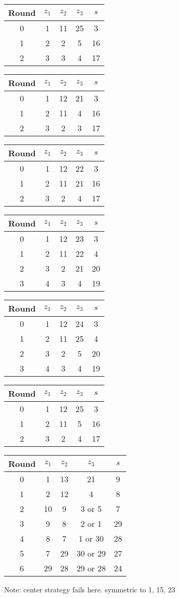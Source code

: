 \begin{tabular}{c | c | c | c | c }
Round & $z_1$ & $z_2$ & $z_3$ & $s$ \\
\hline
0 & 1 & 11 & 25 & 3 \\
1 & 2 & 2 & 5 & 16 \\
2 & 3 & 3 & 4 & 17
\end{tabular}

\begin{tabular}{c | c | c | c | c }
Round & $z_1$ & $z_2$ & $z_3$ & $s$ \\
\hline
0 & 1 & 12 & 21 & 3 \\
1 & 2 & 11 & 4 & 16 \\
2 & 3 & 2 & 3 & 17
\end{tabular}

\begin{tabular}{c | c | c | c | c }
Round & $z_1$ & $z_2$ & $z_3$ & $s$ \\
\hline
0 & 1 & 12 & 22 & 3 \\
1 & 2 & 11 & 21 & 16 \\
2 & 3 & 2 & 4 & 17
\end{tabular}

\begin{tabular}{c | c | c | c | c }
Round & $z_1$ & $z_2$ & $z_3$ & $s$ \\
\hline
0 & 1 & 12 & 23 & 3 \\
1 & 2 & 11 & 22 & 4 \\
2 & 3 & 2 & 21 & 20 \\
3 & 4 & 3 & 4 & 19
\end{tabular}

\begin{tabular}{c | c | c | c | c }
Round & $z_1$ & $z_2$ & $z_3$ & $s$ \\
\hline
0 & 1 & 12 & 24 & 3 \\
1 & 2 & 11 & 25 & 4 \\
2 & 3 & 2 & 5 & 20 \\
3 & 4 & 3 & 4 & 19
\end{tabular}

\begin{tabular}{c | c | c | c | c }
Round & $z_1$ & $z_2$ & $z_3$ & $s$ \\
\hline
0 & 1 & 12 & 25 & 3 \\
1 & 2 & 11 & 5 & 16 \\
2 & 3 & 2 & 4 & 17
\end{tabular}

\begin{tabular}{c | c | c | c | c }
Round & $z_1$ & $z_2$ & $z_3$ & $s$ \\
\hline
0 & 1 & 13 & 21 & 9 \\
1 & 2 & 12 & 4 & 8 \\
2 & 10 & 9 & 3 or 5 & 7 \\
3 & 9 & 8 & 2 or 1 & 29 \\
4 & 8 & 7 & 1 or 30 & 28 \\
5 & 7 & 29 & 30 or 29 & 27 \\
6 & 29 & 28 & 29 or 28 & 24
\end{tabular}
Note: center strategy fails here. symmetric to 1, 15, 23

